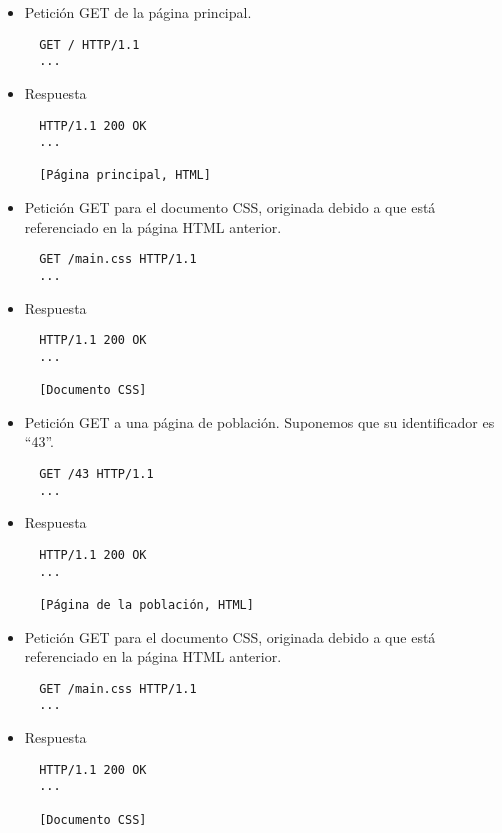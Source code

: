 \begin{itemize}

\item Petición GET de la página principal.

\begin{verbatim}
  GET / HTTP/1.1
  ...
\end{verbatim}

\item Respuesta

\begin{verbatim}
  HTTP/1.1 200 OK
  ...

  [Página principal, HTML]
\end{verbatim}


\item Petición GET para el documento CSS, originada debido a que está referenciado en la página HTML anterior.

\begin{verbatim}
  GET /main.css HTTP/1.1
  ...
\end{verbatim}

\item Respuesta

\begin{verbatim}
  HTTP/1.1 200 OK
  ...

  [Documento CSS]
\end{verbatim}
  
\item Petición GET a una página de población.
  Suponemos que su identificador es ``43''.

\begin{verbatim}
  GET /43 HTTP/1.1
  ...
\end{verbatim}

\item Respuesta

\begin{verbatim}
  HTTP/1.1 200 OK
  ...

  [Página de la población, HTML]
\end{verbatim}

\item Petición GET para el documento CSS, originada debido a que está referenciado en la página HTML anterior.

\begin{verbatim}
  GET /main.css HTTP/1.1
  ...
\end{verbatim}

\item Respuesta

\begin{verbatim}
  HTTP/1.1 200 OK
  ...

  [Documento CSS]
\end{verbatim}

\end{itemize}


